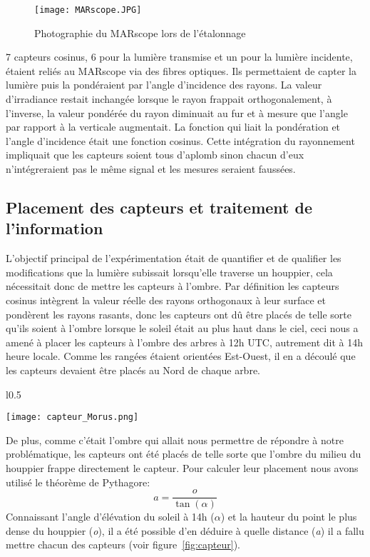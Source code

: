 \documentclass[12pt]{report}
\begin{document}
\begin{figure}[h]
  \centering
  \texttt{[image: MARscope.JPG]}
  \caption{Photographie du MARscope lors de l'étalonnage\label{fig:MARscope}}
\end{figure}

7 capteurs cosinus, 6 pour la lumière transmise et un pour la lumière incidente,
étaient reliés au MARscope via des fibres optiques. Ils permettaient de capter la
lumière puis la pondéraient par l'angle d'incidence
des rayons. La valeur d'irradiance restait inchangée
lorsque le rayon frappait orthogonalement, à l'inverse, la valeur pondérée du rayon
diminuait au fur et à mesure que l'angle par rapport à la verticale augmentait. La
fonction qui liait la pondération et l'angle d'incidence était une fonction
cosinus. Cette intégration du rayonnement
impliquait que les capteurs soient tous d'aplomb sinon chacun d'eux
n'intégreraient pas le même signal et les mesures seraient faussées.


\subsection{Placement des capteurs et traitement de l'information}


L'objectif principal de l'expérimentation était de quantifier et de qualifier les
modifications que la lumière subissait lorsqu'elle traverse un houppier, cela
nécessitait donc de mettre les capteurs à l'ombre. Par définition les capteurs cosinus
intègrent la valeur réelle des rayons orthogonaux à leur surface et pondèrent
les rayons rasants, donc les capteurs ont dû être placés de
telle sorte qu'ils soient à l'ombre lorsque le soleil était au plus haut dans le
ciel, ceci nous a amené à placer les capteurs à l'ombre des arbres à 12h UTC,
autrement dit à 14h heure locale. Comme les rangées étaient orientées Est-Ouest,
il en a découlé que les capteurs devaient être placés au Nord de chaque arbre.


\begin{wrapfigure}{l}{0.5\textwidth}
  \vspace{-20pt}
  \begin{center}
    \texttt{[image: capteur\_Morus.png]}
  \end{center}
  \caption{Photographie d'un capteur sous un \textit{M. alba}\label{fig:capteur}}
\end{wrapfigure}


De plus, comme c'était l'ombre qui allait nous permettre de répondre à
notre problématique, les capteurs ont
été placés de telle sorte que l'ombre du milieu du houppier frappe directement
le capteur. Pour calculer leur placement nous avons utilisé le théorème de
Pythagore:
\[
    a = \frac{o}{\tan(\alpha)}
\]
Connaissant l'angle d'élévation du soleil à 14h ($\alpha$) et la hauteur du
point le plus dense du houppier (\textit{o}), il a été possible d'en déduire à quelle
distance (\textit{a}) il a fallu mettre chacun des capteurs (voir figure~\ref{fig:capteur}).
\end{document}
